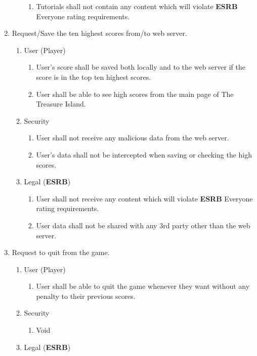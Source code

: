 \documentclass[]{article}
\begin{document}
\begin{enumerate}[{BE}1.]
\begin{enumerate}[{VP2}.1]
\begin{enumerate}
				\item Tutorials shall not contain any content which will violate \textbf{ESRB} Everyone rating requirements.
			\end{enumerate}
	\end{enumerate}
	\item Request/Save the ten highest scores from/to web server.
	\begin{enumerate}[{VP3}.1]
		\item User (Player)
			\begin{enumerate}
				\item User's score shall be saved both locally and to the web server if the score is in the top ten highest scores.
				\item User shall be able to see high scores from the main page of The Treasure Island.
			\end{enumerate}
		\item Security
			\begin{enumerate}
				\item User shall not receive any malicious data from the web server.
				\item User's data shall not be intercepted when saving or checking the high scores.
			\end{enumerate}
		\item Legal (\textbf{ESRB})
			\begin{enumerate}
				\item User shall not receive any content which will violate \textbf{ESRB} Everyone rating requirements.
				\item User data shall not be shared with any 3rd party other than the web server. 
			\end{enumerate}
	\end{enumerate}
	\item Request to quit from the game.
	\begin{enumerate}[{VP4}.1]
		\item User (Player)
			\begin{enumerate}
				\item User shall be able to quit the game whenever they want without any penalty to their previous scores.
			\end{enumerate}
		\item Security
			\begin{enumerate}
				\item Void
			\end{enumerate}
		\item Legal (\textbf{ESRB})

\end{enumerate}
\end{enumerate}
\end{document}
